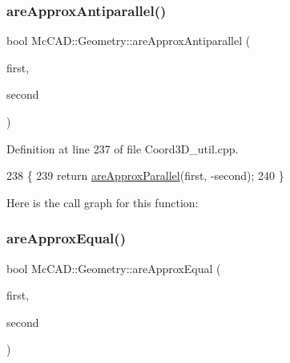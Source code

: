 \subsubsection{\texorpdfstring{are\+Approx\+Antiparallel()}{areApproxAntiparallel()}\hspace{0.1cm}{\footnotesize\ttfamily [2/2]}}
{\footnotesize\ttfamily bool Mc\+C\+A\+D\+::\+Geometry\+::are\+Approx\+Antiparallel (\begin{DoxyParamCaption}\item[{const \hyperlink{classMcCAD_1_1Geometry_1_1Coord3D}{Coord3D} \&}]{first,  }\item[{const \hyperlink{classMcCAD_1_1Geometry_1_1Coord3D}{Coord3D} \&}]{second }\end{DoxyParamCaption})}



Definition at line 237 of file Coord3\+D\+\_\+util.\+cpp.


\begin{DoxyCode}
238                               \{
239     \textcolor{keywordflow}{return} \hyperlink{namespaceMcCAD_1_1Geometry_a5f22eddbae2e5a4f839f409d20d54330}{areApproxParallel}(first, -second);
240 \}
\end{DoxyCode}
Here is the call graph for this function\+:
\mbox{\label{namespaceMcCAD_1_1Geometry_a41fdb0f8b08a3b0dfc6547d0e0c6841d}} 
\subsubsection{\texorpdfstring{are\+Approx\+Equal()}{areApproxEqual()}\hspace{0.1cm}{\footnotesize\ttfamily [1/4]}}
{\footnotesize\ttfamily bool Mc\+C\+A\+D\+::\+Geometry\+::are\+Approx\+Equal (\begin{DoxyParamCaption}\item[{const \hyperlink{namespaceMcCAD_1_1Geometry_ac043b37a4a7e849fca22869e1982d2f8}{coord\+\_\+type} \&}]{first,  }\item[{const \hyperlink{namespaceMcCAD_1_1Geometry_ac043b37a4a7e849fca22869e1982d2f8}{coord\+\_\+type} \&}]{second }\end{DoxyParamCaption})}



